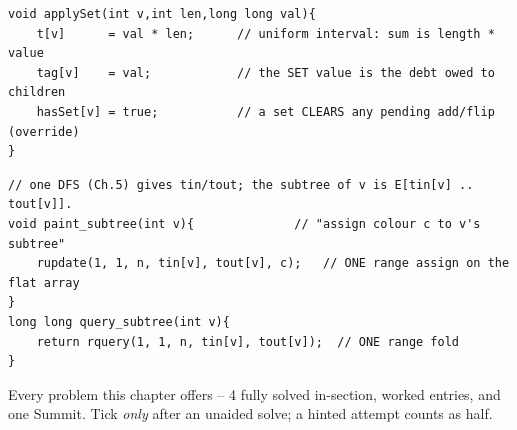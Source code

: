 \begin{lstlisting}[caption={Drill 4 -- assign override (from lst:c15-assign)}]
void applySet(int v,int len,long long val){
    t[v]      = val * len;      // uniform interval: sum is length * value
    tag[v]    = val;            // the SET value is the debt owed to children
    hasSet[v] = true;           // a set CLEARS any pending add/flip (override)
}
\end{lstlisting}

\begin{lstlisting}[caption={Drill 5 -- subtree lazy via Euler (from lst:c15-620-soln, prop:c15-flatten)}]
// one DFS (Ch.5) gives tin/tout; the subtree of v is E[tin[v] .. tout[v]].
void paint_subtree(int v){              // "assign colour c to v's subtree"
    rupdate(1, 1, n, tin[v], tout[v], c);   // ONE range assign on the flat array
}
long long query_subtree(int v){
    return rquery(1, 1, n, tin[v], tout[v]);  // ONE range fold
}
\end{lstlisting}


Every problem this chapter offers -- 4 fully solved in-section, worked entries, and one
Summit. Tick \emph{only} after an unaided solve; a hinted attempt counts as half.

